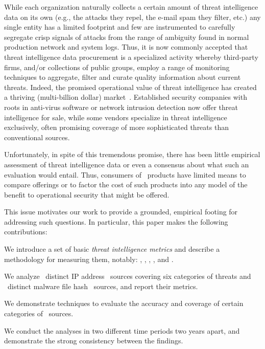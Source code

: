 While each organization naturally collects a certain amount of threat
intelligence data on its own (e.g., the attacks they repel, the e-mail
spam they filter, etc.) any single entity has a limited footprint and
few are instrumented to carefully segregate crisp signals of attacks
from the range of ambiguity found in normal production network and
system logs.  Thus, it is now commonly accepted that threat
intelligence data procurement is a specialized activity whereby
third-party firms, and/or collections of public groups, employ a range
of monitoring techniques to aggregate, filter and curate quality
information about current threats.  Indeed, the promised operational
value of threat intelligence has created a thriving (multi-billion
dollar) market~\cite{timarket}. Established security companies with
roots in anti-virus software or network intrusion detection now offer
threat intelligence for sale, while some vendors specialize in threat
intelligence exclusively, often promising coverage of more
sophisticated threats than conventional sources.

Unfortunately, in spite of this tremendous promise, there has been
little empirical assessment of threat intelligence data or even a
consensus about what such an evaluation would entail.  Thus, consumers
of \ti\ products have limited means to compare offerings
or to factor the cost of such products into any model of the benefit
to operational security that might be offered.

This issue motivates our work to provide a grounded,
empirical footing for addressing such questions.  In particular, this
paper makes the following contributions:
\begin{prettylist}
\item We introduce a set of basic \emph{threat intelligence metrics}
and describe a methodology for measuring them, notably: ,
, ,
,  and .
\item We analyze \numipfeeds\ distinct IP address \ti\ sources covering
six categories of threats and \numhashfeeds\ distinct malware file hash
\ti\ sources, and report their metrics.
\item We demonstrate techniques to evaluate the accuracy and coverage of
certain categories of \ti\ sources.
\item We conduct the analyses in two different time periods two years apart,
and demonstrate the strong consistency between the findings.
\end{prettylist}

